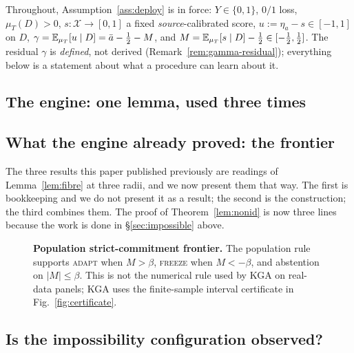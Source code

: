 Throughout, Assumption~\ref{ass:deploy} is in force: $Y\in\{0,1\}$, $0/1$ loss, $\mu_T(D)>0$,
$s:\mathcal X\to[0,1]$ a fixed \emph{source}-calibrated score, $u:=\eta_a-s\in[-1,1]$ on $D$,
$\gamma=\mathbb{E}_{\mu_T}[u\mid D]=\bar a-\tfrac12-M$, and
$M=\mathbb{E}_{\mu_T}[s\mid D]-\tfrac12\in[-\tfrac12,\tfrac12]$. The residual $\gamma$ is \emph{defined},
not derived (Remark~\ref{rem:gamma-residual}); everything below is a statement about what a
procedure can learn about it.

\subsection{The engine: one lemma, used three times}


\subsection{What the engine already proved: the frontier}
The three results this paper published previously are readings of Lemma~\ref{lem:fibre} at three
radii, and we now present them that way. The first is bookkeeping and we do not present it as a
result; the second is the construction; the third combines them. The proof of
Theorem~\ref{lem:nonid} is now three lines because the work is done in \S\ref{sec:impossible}
above.



\begin{figure}[t]
\centering
{}
\caption{\textbf{Population strict-commitment frontier.} The population rule supports
\textsc{adapt} when $M>\beta$, \textsc{freeze} when $M<-\beta$, and abstention on
$|M|\le\beta$. This is not the numerical rule used by KGA on real-data panels; KGA uses the
finite-sample interval certificate in Fig.~\ref{fig:certificate}.}
\label{fig:population-frontier}
\end{figure}



\subsection{Is the impossibility configuration observed?}\label{sec:necessity-observed}


